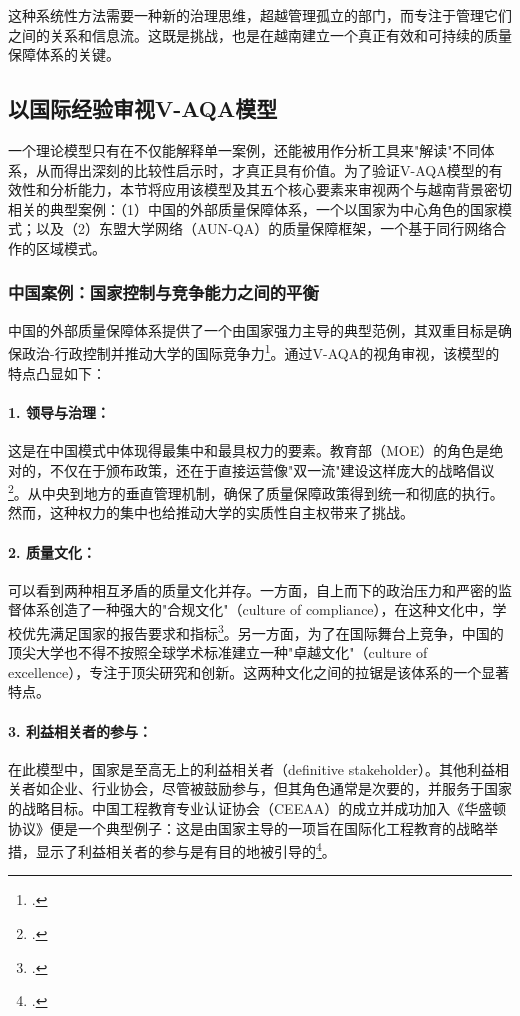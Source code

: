这种系统性方法需要一种新的治理思维，超越管理孤立的部门，而专注于管理它们之间的关系和信息流。这既是挑战，也是在越南建立一个真正有效和可持续的质量保障体系的关键。



\subsection{以国际经验审视V-AQA模型}
\label{subsec:soi_chieu_quoc_te}
一个理论模型只有在不仅能解释单一案例，还能被用作分析工具来"解读"不同体系，从而得出深刻的比较性启示时，才真正具有价值。为了验证V-AQA模型的有效性和分析能力，本节将应用该模型及其五个核心要素来审视两个与越南背景密切相关的典型案例：（1）中国的外部质量保障体系，一个以国家为中心角色的国家模式；以及（2）东盟大学网络（AUN-QA）的质量保障框架，一个基于同行网络合作的区域模式。

\subsubsection{中国案例：国家控制与竞争能力之间的平衡}
\label{subsubsec:case_china}
中国的外部质量保障体系提供了一个由国家强力主导的典型范例，其双重目标是确保政治-行政控制并推动大学的国际竞争力\footcite{ChinaEQA_Overview}。通过V-AQA的视角审视，该模型的特点凸显如下：

\paragraph{1. 领导与治理：} 这是在中国模式中体现得最集中和最具权力的要素。教育部（MOE）的角色是绝对的，不仅在于颁布政策，还在于直接运营像"双一流"建设这样庞大的战略倡议\footcite{ChinaEQA_Reforms2015}。从中央到地方的垂直管理机制，确保了质量保障政策得到统一和彻底的执行。然而，这种权力的集中也给推动大学的实质性自主权带来了挑战。

\paragraph{2. 质量文化：} 可以看到两种相互矛盾的质量文化并存。一方面，自上而下的政治压力和严密的监督体系创造了一种强大的"合规文化"（culture of compliance），在这种文化中，学校优先满足国家的报告要求和指标\footcite{ChinaEQA_Ideology2023}。另一方面，为了在国际舞台上竞争，中国的顶尖大学也不得不按照全球学术标准建立一种"卓越文化"（culture of excellence），专注于顶尖研究和创新。这两种文化之间的拉锯是该体系的一个显著特点。

\paragraph{3. 利益相关者的参与：} 在此模型中，国家是至高无上的利益相关者（definitive stakeholder）。其他利益相关者如企业、行业协会，尽管被鼓励参与，但其角色通常是次要的，并服务于国家的战略目标。中国工程教育专业认证协会（CEEAA）的成立并成功加入《华盛顿协议》便是一个典型例子：这是由国家主导的一项旨在国际化工程教育的战略举措，显示了利益相关者的参与是有目的地被引导的\footcite{ChinaEQA_CEEAA_WA}。

